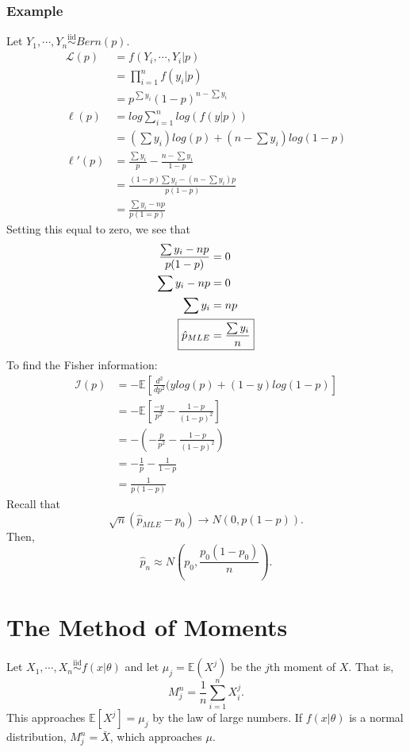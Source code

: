 \documentclass[titlepage, 12pt, leqno]{article}
\begin{document}
\subsubsection{Example}
Let $Y_{1}, \cdots ,Y_{n}\overset{\mathrm{iid}}{\sim}Bern(p)$.
\begin{align*}
    \mathcal{L}(p)
    &= f(Y_{i}, \cdots , Y_{i} |p) \\
    &= \prod_{i=1}^{n}f(y_{i}|p) \\
    &= p^{\sum y_{i}}(1-p)^{n-\sum y_{i}} \\
    \ell(p)
    &= log \sum_{i=1}^{n}log(f(y|p)) \\
    &= (\sum y_{i})log(p) + (n-\sum y_{i})log(1-p) \\
    \ell'(p)
    &= \frac{\sum y_{i}}{p} - \frac{n - \sum y_{i}}{1-p} \\
    &= \frac{(1-p)\sum y_{i} - (n-\sum y_{i})p}{p(1-p)} \\
    &= \frac{\sum y_{i}-np}{p(1=p)}
\end{align*}
Setting this equal to zero, we see that
\begin{align*}
    \frac{\sum y_{i}-np}{p(1-p)}  
    &= 0 \\
    \sum y_{i} - np &= 0 \\
    \sum y_{i} &= np \\
    \Aboxed{\hat p_{MLE} &= \frac{\sum y_{i}}{n}} 
\end{align*}
To find the Fisher information:
\begin{align*}
    \mathcal{I}(p) 
    &= -\mathbb{E}\left[\frac{d^{2}}{dp^{2}}(ylog(p) + (1-y)log(1-p)\right] \\
    &= -\mathbb{E}\left[\frac{-y}{p^{2}} - \frac{1-p}{(1-p)^{2}}\right] \\
    &= -\left(-\frac{p}{p^{2}} - \frac{1-p}{(1-p)^{2}}\right) \\
    &= -\frac{1}{p} - \frac{1}{1-p} \\
    &= \frac{1}{p(1-p)}
\end{align*}
Recall that
\[
\sqrt{n}(\hat p_{MLE} - p_{0}) \rightarrow N(0,p(1-p)).
\]
Then,
\[
\hat p_{n} \approx N\left(p_{0}, \frac{p_{0}(1-p_{0})}{n}\right).
\]
\pagebreak
\section{The Method of Moments}
Let $X_{1}, \cdots , X_{n} \overset{\mathrm{iid}}{\sim}f(x|\theta)$ and let
$\mu_{j} = \mathbb{E}(X^{j})$ be the $j$th moment of $X$. That is,
\[
M_{j}^{n} = \frac{1}{n}\sum_{i=1}^{n}X_{i}^{j}.
\]
This approaches $\mathbb{E}[X^{j}] = \mu_{j}$ by the law of large numbers. If
$f(x|\theta)$ is a normal distribution, $M_{j}^{n}=\bar X$, which approaches
$\mu$.
\end{document}
